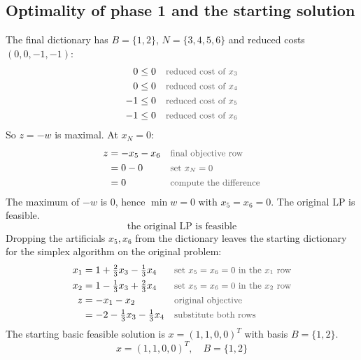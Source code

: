 \documentclass[a4paper,11pt]{article}
\newif\ifexplain
\newcommand{\teil}[1]{\subsection*{#1}}
\newcommand{\why}[1]{\text{\small\color{black!65}#1}}
\newcommand{\explain}[1]{\ifexplain\begin{erklbox}#1\end{erklbox}\fi}
\begin{document}
\explain{Zweiter Schritt: $x_2$ steigt auf $1$, $x_6$ fällt auf null. Jetzt sind beide künstlichen Variablen Nichtbasisvariablen. In der Zielfunktion sind sie die einzigen Variablen mit negativen Koeffizienten, alle anderen Koeffizienten sind genau null.}
\teil{Optimality of phase 1 and the starting solution}
The final dictionary has $B=\{1,2\}$, $N=\{3,4,5,6\}$ and reduced costs $(0,0,-1,-1)$:
\begin{align*}
0&\leq 0&&\why{reduced cost of $x_3$}\\
0&\leq 0&&\why{reduced cost of $x_4$}\\
-1&\leq 0&&\why{reduced cost of $x_5$}\\
-1&\leq 0&&\why{reduced cost of $x_6$}
\end{align*}
So $z=-w$ is maximal. At $x_N=0$:
\begin{align*}
z&=-x_5-x_6&&\why{final objective row}\\
&=0-0&&\why{set $x_N=0$}\\
&=0&&\why{compute the difference}
\end{align*}
The maximum of $-w$ is $0$, hence $\min w=0$ with $x_5=x_6=0$. The original LP is feasible.
\[ \boxed{\text{the original LP is feasible}} \]
Dropping the artificials $x_5,x_6$ from the dictionary leaves the starting dictionary for the simplex algorithm on the original problem:
\begin{align*}
x_1&=1+\tfrac23x_3-\tfrac13x_4&&\why{set $x_5=x_6=0$ in the $x_1$ row}\\
x_2&=1-\tfrac13x_3+\tfrac23x_4&&\why{set $x_5=x_6=0$ in the $x_2$ row}\\
z&=-x_1-x_2&&\why{original objective}\\
&=-2-\tfrac13x_3-\tfrac13x_4&&\why{substitute both rows}
\end{align*}
The starting basic feasible solution is $x=(1,1,0,0)^T$ with basis $B=\{1,2\}$.
\[ \boxed{x=(1,1,0,0)^T,\quad B=\{1,2\}} \]
\explain{Phase 1 endet mit $w=0$: beide künstlichen Variablen sind bei null und nicht mehr in der Basis. Genau das war das Ziel. Die verbleibende Basis $\{1,2\}$ mit $x_1=x_2=1$ ist eine Ecke des Originalproblems und damit die Startlösung, nach der die Aufgabe fragt.}
\explain{Zwei Kontrollen dazu. Erstens: $2\cdot 1+1=3$ und $1+2\cdot 1=3$, beide $>$-Schranken sind aktiv, die Lösung liegt auf der Ecke, wo sich die beiden Geraden schneiden. Zweitens: die reduzierten Kosten $-\tfrac13$ und $-\tfrac13$ sind beide negativ, also wäre die Simplex-Schleife hier sofort am Optimum. Example 2.2 in 6.3 hat dieses Vergnügen nicht und braucht echte Pivot-Schritte.}
\explain{Typische Fehler in dieser Aufgabe: die Schlupfvariable bei $>$-Ungleichungen mit plus statt minus einführen (dann hat die Startbasis gar keine negative Komponente und man sieht das Problem nicht), die künstlichen Variablen in der Zielfunktion falsch vorzeichen, oder nach Phase 1 vergessen, die künstlichen Variablen aus dem Dictionary zu entfernen. Sie dürfen danach nicht mehr ansteigen, sonst verlässt man die zulässige Menge des Originalproblems.}
\end{document}
